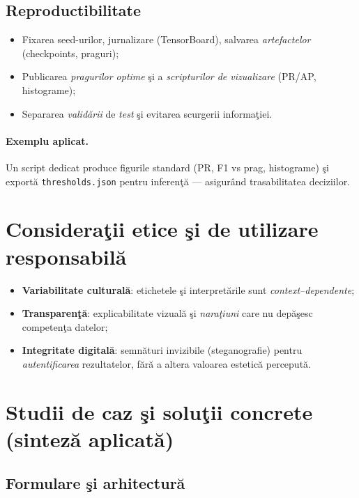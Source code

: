 \subsection{Reproductibilitate}

\begin{itemize}[leftmargin=*, itemsep=2pt, topsep=2pt]
  \item Fixarea seed-urilor, jurnalizare (TensorBoard), salvarea \emph{artefactelor} (checkpoints, praguri);
  \item Publicarea \emph{pragurilor optime} şi a \emph{scripturilor de vizualizare} (PR/AP, histograme);
  \item Separarea \emph{validării} de \emph{test} şi evitarea scurgerii informaţiei.
\end{itemize}

\paragraph{Exemplu aplicat.} Un script dedicat produce figurile standard (PR, F1 vs prag, histograme) şi exportă \texttt{thresholds.json} pentru inferenţă — asigurând trasabilitatea deciziilor.

\section{Consideraţii etice şi de utilizare responsabilă}

\begin{itemize}[leftmargin=*, itemsep=2pt, topsep=2pt]
  \item \textbf{Variabilitate culturală}: etichetele şi interpretările sunt \emph{context–dependente};
  \item \textbf{Transparenţă}: explicabilitate vizuală şi \emph{naraţiuni} care nu depăşesc competenţa datelor;
  \item \textbf{Integritate digitală}: semnături invizibile (steganografie) pentru \emph{autentificarea} rezultatelor, fără a altera valoarea estetică percepută.
\end{itemize}

\section{Studii de caz şi soluţii concrete (sinteză aplicată)}

\subsection{Formulare şi arhitectură}

